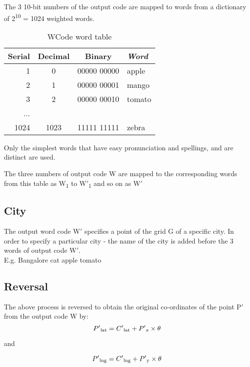 \documentclass[conference]{IEEEtran}
\begin{document}
The 3 10-bit numbers of the output code are mapped to words from a dictionary of 2\textsuperscript{10} = 1024 weighted words.
\begin{table}[h!]
\caption{WCode word table} \begin{center}
\bgroup
\def\arraystretch{1.4}%
\begin{tabular}{r|c|c|l}
\textbf{Serial} & \textbf{Decimal} & \textbf{Binary} & \textbf{\textit{Word}} \\
\hline
1 & 0 & 00000 00000 & apple\\
\hline
2 & 1 & 00000 00001 & mango \\
\hline
3 & 2 & 00000 00010 & tomato \\
... & & & \\
1024 & 1023 & 11111 11111 & zebra
\end{tabular}
\egroup
\end{center} \end{table}

Only the simplest words that have easy pronunciation and spellings, and are distinct are used.

The three numbers of output code W are mapped to the corresponding words from this table as W\textsubscript{1} to W$'$\textsubscript{1} and so on as W$'$
\subsection{City}
The output word code W$'$ specifies a point of the grid G of a specific city. In order to specify a particular city - the name of the city is added before the 3 words of output code W$'$.\\

E.g. Bangalore cat apple tomato

\subsection{Reversal}\label{AA}
The above process is reversed to obtain the original co-ordinates of the point P$'$ from the output code W by:
\begin{equation}P'\textsubscript{lat} = C'\textsubscript{lat} +  P'\textsubscript{x} \times {\theta}\end{equation}

and

\begin{equation}P'\textsubscript{lng} = C'\textsubscript{lng} + P'\textsubscript{y} \times \theta\end{equation}
\end{document}
